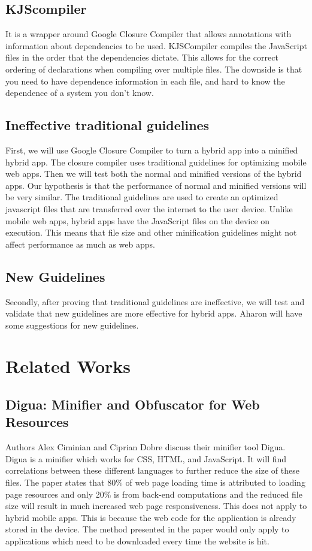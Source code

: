 \documentclass{acm_proc_article-sp}
\begin{document}
\subsection{KJScompiler}
It is a wrapper around Google Closure Compiler that allows annotations with information about dependencies to be used. KJSCompiler compiles the JavaScript files in the order that the dependencies dictate. This allows for the correct ordering of declarations when compiling over multiple files. The downside is that you need to have dependence information in each file, and hard to know the dependence of a system you don’t know. 


\subsection{Ineffective traditional guidelines}
First, we will use Google Closure Compiler to turn a hybrid app into a minified hybrid app. The closure compiler uses traditional guidelines for optimizing mobile web apps. Then we will test both the normal and minified versions of the hybrid apps. Our hypothesis is that the performance of normal and minified versions will be very similar. The traditional guidelines are used to create an optimized javascript files that are transferred over the internet to the user device. Unlike mobile web apps, hybrid apps have the JavaScript files on the device on execution. This means that file size and other minification guidelines might not affect performance as much as web apps. 

\subsection{New Guidelines}
Secondly, after proving that traditional guidelines are ineffective, we will test and validate that new guidelines are more effective for hybrid apps. Aharon will have some suggestions for new guidelines.

\section{Related Works}

\subsection{Digua: Minifier and Obfuscator for Web Resources\cite{ciminiandigua} }
Authors Alex Ciminian and Ciprian Dobre discuss their minifier tool Digua.  Digua is a minifier which works for CSS, HTML, and JavaScript.  It will find correlations between these different languages to further reduce the size of these files.  The paper states that 80\% of web page loading time is attributed to loading page resources and only 20\% is from back-end computations and the reduced file size will result in much increased web page responsiveness.  This does not apply to hybrid mobile apps.  This is because the web code for the application is already stored in the device.  The method presented in the paper would only apply to applications which need to be downloaded every time the website is hit. 
\end{document}
